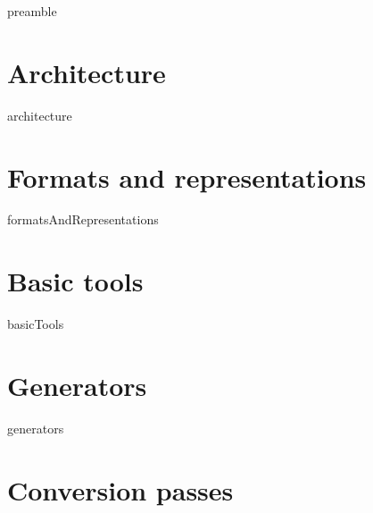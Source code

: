 \documentclass[12pt,a4paper]{article}
\begin{document}



{preamble}


\section{Architecture}

{architecture}


\section{Formats and representations}

{formatsAndRepresentations}



\section{Basic tools}

{basicTools}


\section{Generators}

{generators}



\section{Conversion passes}
\end{document}

